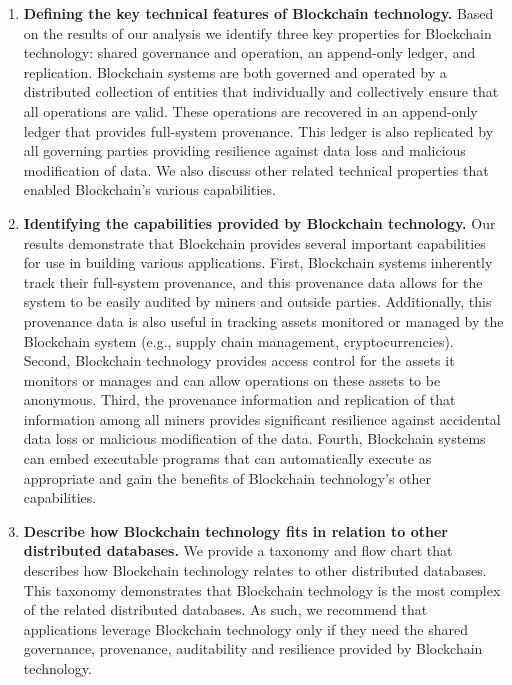 \begin{enumerate}
	\item \textbf{Defining the key technical features of Blockchain technology.}
	Based on the results of our analysis we identify three key properties for Blockchain technology: shared governance and operation, an append-only ledger, and replication.
	Blockchain systems are both governed and operated by a distributed collection of entities that individually and collectively ensure that all operations are valid.
	These operations are recovered in an append-only ledger that provides full-system provenance.
	This ledger is also replicated by all governing parties providing resilience against data loss and malicious modification of data.
	We also discuss other related technical properties that enabled Blockchain's various capabilities.
	
	\item \textbf{Identifying the capabilities provided by Blockchain technology.}
	Our results demonstrate that Blockchain provides several important capabilities for use in building various applications.
	First, Blockchain systems inherently track their full-system provenance, and this provenance data allows for the system to be easily audited by miners and outside parties.
	Additionally, this provenance data is also useful in tracking assets monitored or managed by the Blockchain system (e.g., supply chain management, cryptocurrencies).
	Second, Blockchain technology provides access control for the assets it monitors or manages and can allow operations on these assets to be anonymous.
	Third, the provenance information and replication of that information among all miners provides significant resilience against accidental data loss or malicious modification of the data.
	Fourth, Blockchain systems can embed executable programs that can automatically execute as appropriate and gain the benefits of Blockchain technology's other capabilities.
		
	\item \textbf{Describe how Blockchain technology fits in relation to other distributed databases.}
	We provide a taxonomy and flow chart that describes how Blockchain technology relates to other distributed databases.
	This taxonomy demonstrates that Blockchain technology is the most complex of the related distributed databases.
	As such, we recommend that applications leverage Blockchain technology only if they need the shared governance, provenance, auditability and resilience provided by Blockchain technology.
	

\end{enumerate}
